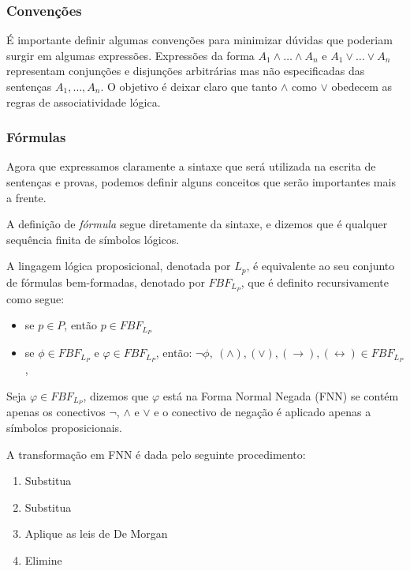 \subsubsection{Convenções} 
É importante definir algumas convenções para minimizar 
dúvidas que poderiam surgir em algumas expressões.
Expressões da forma $A_1 \wedge \ldots \wedge A_n$ e $A_1 \vee \ldots \vee A_n$
representam conjunções e disjunções arbitrárias mas não especificadas das
sentenças $A_1,\ldots,A_n$. O objetivo é deixar claro que tanto $\wedge$ como
$\vee$ obedecem as regras de associatividade lógica. 

\subsubsection{Fórmulas}
Agora que expressamos claramente a sintaxe que será utilizada na escrita de
sentenças e provas, podemos definir alguns conceitos que serão importantes mais
a frente.

A definição de \textit{fórmula} segue diretamente da sintaxe, e dizemos que é
qualquer sequência finita de símbolos lógicos. 

\begin{definition}
    A lingagem lógica proposicional, denotada por $L_p$, é equivalente ao seu
    conjunto de fórmulas bem-formadas, denotado por $FBF_{L_P}$, que é definito
    recursivamente como segue:
    \begin{itemize}
        \item se $p \in P$, então $p \in FBF_{L_P}$
            \item se $\phi \in FBF_{L_P}$ e $\varphi \in FBF_{L_P}$, então: $\neg
                \phi,\ (\wedge), (\vee), (\rightarrow), (\leftrightarrow) \in FBF_{L_P}$, 
            
    \end{itemize}
\end{definition}

\begin{definition} Seja $\varphi \in FBF_{L_P}$, dizemos que $\varphi$ está na Forma Normal Negada (FNN) se contém apenas os conectivos $\neg$, $\wedge$ e $\vee$ e o
    conectivo de negação é aplicado apenas a símbolos proposicionais.
\end{definition}

A transformação em FNN é dada pelo seguinte procedimento:
\begin{enumerate}
    \item Substitua
    \item Substitua
    \item Aplique as leis de De Morgan
    \item Elimine
\end{enumerate}

